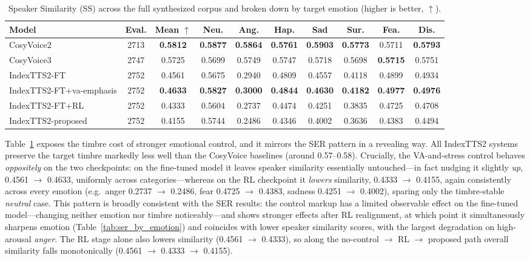 \begin{table}[htbp]
\centering
\small
\caption{Speaker Similarity (SS) across the full synthesized corpus and broken down by target emotion (higher is better, $\uparrow$).}
\label{tab:ss_by_emotion}
\setlength{\tabcolsep}{3pt}
\begin{tabular}{lccccccccc}
\toprule
\textbf{Model} & \textbf{Eval.} & \textbf{Mean $\uparrow$} & \textbf{Neu.} & \textbf{Ang.} & \textbf{Hap.} & \textbf{Sad} & \textbf{Sur.} & \textbf{Fea.} & \textbf{Dis.} \\
\midrule
CosyVoice2 & 2713 & \textbf{0.5812} & \textbf{0.5877} & \textbf{0.5864} & \textbf{0.5761} & \textbf{0.5903} & \textbf{0.5773} & 0.5711 & \textbf{0.5793} \\
CosyVoice3 & 2747 & 0.5725 & 0.5699 & 0.5749 & 0.5747 & 0.5718 & 0.5698 & \textbf{0.5715} & 0.5751 \\
\midrule
IndexTTS2-FT & 2752 & 0.4561 & 0.5675 & 0.2940 & 0.4809 & 0.4557 & 0.4118 & 0.4899 & 0.4934 \\
IndexTTS2-FT+va-emphasis & 2752 & \textbf{0.4633} & \textbf{0.5827} & \textbf{0.3000} & \textbf{0.4844} & \textbf{0.4630} & \textbf{0.4182} & \textbf{0.4977} & \textbf{0.4976} \\
IndexTTS2-FT+RL & 2752 & 0.4333 & 0.5604 & 0.2737 & 0.4474 & 0.4251 & 0.3835 & 0.4725 & 0.4708 \\
IndexTTS2-proposed & 2752 & 0.4155 & 0.5744 & 0.2486 & 0.4346 & 0.4002 & 0.3636 & 0.4383 & 0.4494 \\
\bottomrule
\end{tabular}
\end{table}

Table~\ref{tab:ss_by_emotion} exposes the timbre cost of stronger emotional control, and it mirrors the SER pattern in a revealing way. All IndexTTS2 systems preserve the target timbre markedly less well than the CosyVoice baselines (around 0.57--0.58). Crucially, the VA-and-stress control behaves \emph{oppositely} on the two checkpoints: on the fine-tuned model it leaves speaker similarity essentially untouched---in fact nudging it slightly \emph{up}, 0.4561 $\rightarrow$ 0.4633, uniformly across categories---whereas on the RL checkpoint it \emph{lowers} similarity, 0.4333 $\rightarrow$ 0.4155, again consistently across every emotion (e.g.\ anger 0.2737 $\rightarrow$ 0.2486, fear 0.4725 $\rightarrow$ 0.4383, sadness 0.4251 $\rightarrow$ 0.4002), sparing only the timbre-stable \textit{neutral} case. This pattern is broadly consistent with the SER results: the control markup has a limited observable effect on the fine-tuned model---changing neither emotion nor timbre noticeably---and shows stronger effects after RL realignment, at which point it simultaneously sharpens emotion (Table~\ref{tab:ser_by_emotion}) and coincides with lower speaker similarity scores, with the largest degradation on high-arousal \textit{anger}. The RL stage alone also lowers similarity (0.4561 $\rightarrow$ 0.4333), so along the no-control $\rightarrow$ RL $\rightarrow$ proposed path overall similarity falls monotonically (0.4561 $\rightarrow$ 0.4333 $\rightarrow$ 0.4155).

